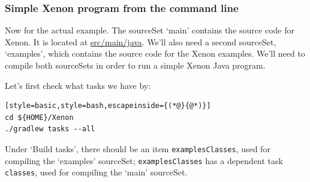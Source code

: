 \documentclass[12pt, a4paper, twoside,openany,titlepage]{article}
\begin{document}
\subsubsection{Simple Xenon program from the command line}

Now for the actual example. The sourceSet `main' contains the source code for Xenon. It is located at \url{src/main/java}. We'll also need a second sourceSet, `examples', which contains the source code for the Xenon examples. We'll need to compile both sourceSets in order to run a simple Xenon Java program.

Let's first check what tasks we have by:
\begin{lstlisting}[style=basic,style=bash,escapeinside={(*@}{@*)}]
cd ${HOME}/Xenon
./gradlew tasks --all
\end{lstlisting} %

Under `Build tasks', there should be an item \texttt{examplesClasses}, used for compiling the `examples' sourceSet; \texttt{examplesClasses} has a dependent task \texttt{classes}, used for compiling the `main' sourceSet.
\end{document}
